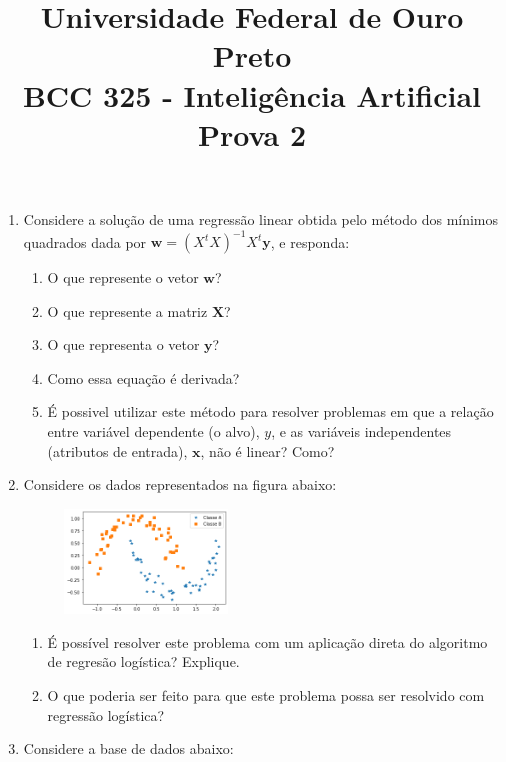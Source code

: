 \documentclass{article}
\title{\vspace{-2 cm} Universidade Federal de Ouro Preto \\ BCC 325 - Inteligência Artificial \\ Prova 2}
\date{}
\begin{document}
\maketitle

\vspace{-2 cm}
\begin{enumerate}

\item Considere a solução de uma regressão linear obtida pelo método dos mínimos quadrados dada por $\mathbf{w} = (X^{t}X)^{-1}X^t\mathbf{y}$, e responda:
\begin{enumerate}
    \item O que represente o vetor $\mathbf{w}$?
    \item O que represente a matriz $\mathbf{X}$?
    \item O que representa o vetor $\mathbf{y}$?
    \item Como essa equação é derivada?
    \item É possivel utilizar este método para resolver problemas em que a relação entre variável dependente (o alvo), $y$, e as variáveis independentes (atributos de entrada), $\mathbf{x}$, não é linear? Como?  
\end{enumerate}

\item Considere os dados representados na figura abaixo:

    \begin{figure}[!ht]
        \centering
        \includegraphics[width=0.41\textwidth]{moons.png}
    \end{figure}
    
    \begin{enumerate}
        \item É possível resolver este problema com um aplicação direta do algoritmo de regresão logística? Explique.
        \item O que poderia ser feito para que este problema possa ser resolvido com regressão logística?
    \end{enumerate}

\item Considere a base de dados abaixo:


\end{enumerate}
\end{document}
